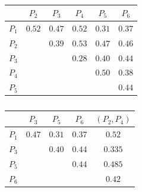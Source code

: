 \documentclass[12pt, a4paper]{article}
\begin{document}
\begin{latin}
    \begin{table}[h]
        \caption{}
        \label{average_linkage}
        \begin{subtable}{0.45\linewidth}
            \caption{}
            \begin{tabular}{c|c|c|c|c|c}
                      & $P_2$  & $P_3$  & $P_4$                        & $P_5$  & $P_6$  \\
                \hline
                $P_1$ & $0.52$ & $0.47$ & $0.52$                       & $0.31$ & $0.37$ \\
                \hline
                $P_2$ &        & $0.39$ & \cellcolor{purple!30} $0.53$ & $0.47$ & $0.46$ \\
                \hline
                $P_3$ &        &        & $0.28$                       & $0.40$ & $0.44$ \\
                \hline
                $P_4$ &        &        &                              & $0.50$ & $0.38$ \\
                \hline
                $P_5$ &        &        &                              &        & $0.44$ \\
            \end{tabular}
        \end{subtable}
        \hfill
        \begin{subtable}{0.45\linewidth}
            \caption{}
            \begin{tabular}{c|c|c|c|c}
                      & $P_3$  & $P_5$  & $P_6$  & $(P_2, P_4)$                 \\
                \hline
                $P_1$ & $0.47$ & $0.31$ & $0.37$ & \cellcolor{purple!30} $0.52$ \\
                \hline
                $P_3$ &        & $0.40$ & $0.44$ & $0.335$                      \\
                \hline
                $P_5$ &        &        & $0.44$ & $0.485$                      \\
                \hline
                $P_6$ &        &        &        & $0.42$                       \\
            \end{tabular}
        \end{subtable}
        \newline
        \begin{subtable}{0.45\linewidth}
            \caption{}
            \begin{tabular}{c|c|c|c}

\end{tabular}
\end{subtable}
\end{table}
\end{latin}
\end{document}
